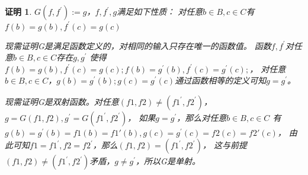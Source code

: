 \documentclass{article}
\theoremstyle{mystyle}
\theoremstyle{zproofstyle}
\newtheorem*{zproof}{证明}
\begin{document}
\begin{zproof}
    $G(f,f^\prime):=g$，$f,f^\prime,g$满足如下性质：
    对任意$b \in B, c \in C$有$f(b)=g(b),f^\prime(c)=g(c)$

    现需证明G是满足函数定义的，对相同的输入只存在唯一的函数值。
    函数$f,f^\prime$对任意$b \in B, c \in C$存在$g, g^\prime$
    使得$f(b)=g(b),f^\prime(c)=g(c); f(b)=g^\prime(b),f^\prime(c)=g^\prime(c);$，
    对任意$b \in B, c \in C$，$g(b)=g^\prime(b);g(c)=g^\prime(c)$通过函数相等的定义可知$g=g^\prime$。

    现需证明G是双射函数。对任意$(f1,f2) \neq (f1^\prime,f2^\prime)$，
    $g=G(f1,f2),g^\prime=G(f1^\prime,f2^\prime)$，
    如果$g = g^\prime$，那么对任意$b \in B, c \in C$
    有$g(b)=g^\prime(b)=f1(b)=f1\prime(b),g(c)=g^\prime(c)=f2(c)=f2\prime(c)$，
    由此可知$f1=f1^\prime,f2=f2^\prime$，那么$(f1,f2) = (f1^\prime,f2^\prime)$，
    这与前提$(f1,f2) \neq (f1^\prime,f2^\prime)$矛盾，$g \neq g^\prime$，所以G是单射。

    

\end{zproof}
\end{document}
